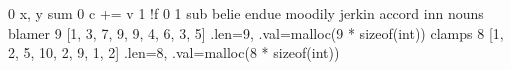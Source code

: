 \expandafter\def\csname cpp:swap\endcsname{0}
\expandafter\def\csname cpp:PARAM(x,y)\endcsname{x, y}
\expandafter\def\csname cpp:comp\endcsname{sum}
\expandafter\def\csname cpp:INIT\endcsname{0}
\expandafter\def\csname cpp:PROCESS(c,v)\endcsname{c += v}
\expandafter\def\csname cpp:NOT\endcsname{1}
\expandafter\def\csname cpp:COND(f,c,v)\endcsname{!f}
\expandafter\def\csname cpp:FALSE\endcsname{0}
\expandafter\def\csname cpp:TRUE\endcsname{1}
\expandafter\def\csname cpp:join\endcsname{sub}
\expandafter\def\csname cpp:FORALLIN\endcsname{belie}
\expandafter\def\csname cpp:A\endcsname{endue}
\expandafter\def\csname cpp:B\endcsname{moodily}
\expandafter\def\csname cpp:C\endcsname{jerkin}
\expandafter\def\csname cpp:I\endcsname{accord}
\expandafter\def\csname cpp:J\endcsname{inn}
\expandafter\def\csname cpp:F\endcsname{nouns}
\expandafter\def\csname cpp:U\endcsname{blamer}
\expandafter\def\csname cpp:TABU_LEN\endcsname{9}
\expandafter\def\csname cpp:TABU_VAL\endcsname{[1, 3, 7, 9, 9, 4, 6, 3, 5]}
\expandafter\def\csname cpp:TABU\endcsname{{.len=9, .val=malloc(9 * sizeof(int))}}
\expandafter\def\csname cpp:V\endcsname{clamps}
\expandafter\def\csname cpp:TABV_LEN\endcsname{8}
\expandafter\def\csname cpp:TABV_VAL\endcsname{[1, 2, 5, 10, 2, 9, 1, 2]}
\expandafter\def\csname cpp:TABV\endcsname{{.len=8, .val=malloc(8 * sizeof(int))}}

\def\C#1{\csname cpp:#1\endcsname}

